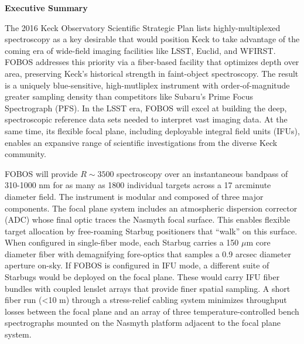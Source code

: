 
\centerline{{\large\bf Executive Summary}}


The 2016 Keck Observatory Scientific Strategic Plan lists highly-multiplexed spectroscopy as a key desirable that would
position Keck to take advantage of the coming era of wide-field imaging facilities like LSST, Euclid, and WFIRST.  FOBOS addresses this priority via a fiber-based facility that optimizes depth over area, preserving Keck's historical strength in faint-object spectroscopy.  The result is a uniquely blue-sensitive, high-mutliplex instrument with order-of-magnitude greater sampling density than competitors like Subaru's Prime Focus Spectrograph (PFS).  In the LSST era, FOBOS will excel at building the deep, spectroscopic reference data sets needed to interpret vast imaging data.  At the same time, its flexible focal plane, including deployable integral field units (IFUs), enables an expansive range of scientific investigations from the diverse Keck community.

FOBOS will provide $R \sim 3500$ spectroscopy over an instantaneous bandpass of 310-1000 nm for as many as 1800
individual targets across a 17 arcminute diameter field.  The instrument is modular and composed of three major
components.  The focal plane system includes an atmospheric dispersion corrector (ADC) whose final optic traces the
Nasmyth focal surface.  This enables flexible target allocation by free-roaming Starbug positioners that ``walk'' on
this surface.  When configured in single-fiber mode, each Starbug carries a 150 $\mu$m core diameter fiber with
demagnifying fore-optics that samples a 0.9 arcsec diameter aperture on-sky.  If FOBOS is configured in IFU mode, a
different suite of Starbugs would be deployed on the focal plane.  These would carry IFU fiber bundles with coupled
lenslet arrays that provide finer spatial sampling.  A short fiber run (<10 m) through a stress-relief cabling system
minimizes throughput losses between the focal plane and an array of three temperature-controlled bench spectrographs
mounted on the Nasmyth platform adjacent to the focal plane system.

